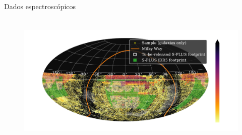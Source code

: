 \begin{frame}[c]{Dados espectroscópicos}
    \begin{figure}
        \centering
        \includegraphics[height=6.5cm]{script/images/spectroscopic_compilation.pdf}
    \end{figure}
\end{frame}





